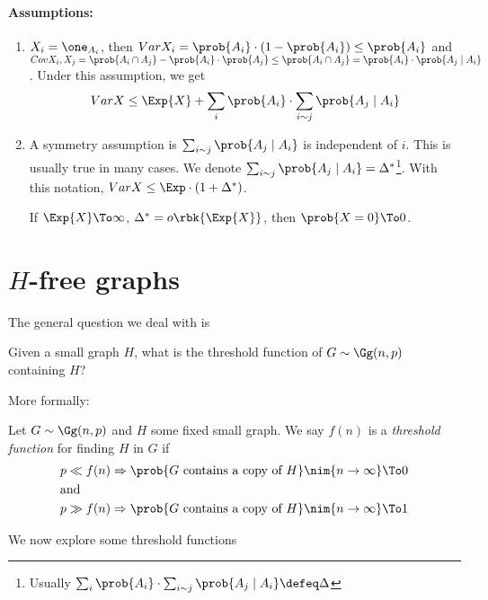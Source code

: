 \documentclass[a4paper, 11pt, oneside]{book}
\begin{document}
\paragraph{Assumptions:}
\begin{enumerate}
	\item $X_i = \one_{A_i}$, then $Var{X_i} = \prob{A_i}\cdot(1-\prob{A_i})\le \prob{A_i}$ and $Cov{X_i,X_j} = \prob{A_i\cap A_j} - \prob{A_i}\cdot \prob{A_j}\le \prob{A_i\cap A_j} = \prob{A_i}\cdot \prob{A_j\mid A_i}$. Under this assumption, we get 
	\[
	Var{X}\le \Exp{X} + \sum_i\prob{A_i}\cdot\sum_{i\sim j} \prob{A_j\mid A_i}
	\] 
	\item A symmetry assumption is $\sum_{i\sim j} \prob{A_j\mid A_i}$ is independent of $i$. This is usually true in many cases. We denote $\sum_{i\sim j} \prob{A_j\mid A_i} = \Delta^*$\footnote{Usually $ \sum_i\prob{A_i}\cdot\sum_{i\sim j} \prob{A_j\mid A_i} \defeq \Delta$}. With this notation, $Var{X} \le \Exp\cdot(1+\Delta^*)$.
	\begin{cor}
	If $\Exp{X}	\To \infty$, $\Delta^* = o\rbk{\Exp{X}}$, then $\prob{X=0}\To 0$.
	\end{cor}
\end{enumerate}
\section{$H$-free graphs}
The general question we deal with is
\begin{question}
	Given a small graph $H$, what is the threshold function of $G\sim \Gg(n,p)$ containing $H$?
\end{question}
More formally:
\begin{yellowBox}
\begin{defn}
	 Let $G\sim \Gg(n,p)$ and $H$ some fixed small graph. We say $f(n)$ is a \emph{threshold function} for finding $H$ in $G$ if
	\begin{align*}
		& p\ll f(n) \Rightarrow \prob{G\text{ contains a copy of }H}\nim{n\to\infty}\To 0 \\
		&{\text{\centering and}} \\
		&p\gg f(n) \Rightarrow \prob{G\text{ contains a copy of }H}\nim{n\to\infty}\To 1 \\
	\end{align*}
\end{defn}	
\end{yellowBox}
We now explore some threshold functions
\end{document}
